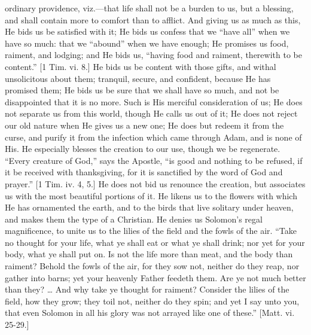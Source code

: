 ordinary providence, viz.—that life shall not be a burden to us, but
a blessing, and shall contain more to comfort than to afflict. And
giving us as much as this, He bids us be satisfied with it; He bids us
confess that we ``have all'' when we have so much: that we
``abound'' when we have enough; He promises us food, raiment,
and lodging; and He bids us, ``having food and raiment, therewith
to be content.'' [1 Tim. vi. 8.] He bids us be content with those
gifts, and withal unsolicitous about them; tranquil, secure, and
confident, because He has promised them; He bids us be sure that we
shall have so much, and not be disappointed that it is no more. Such
is His merciful consideration of us; He does not separate us from this
world, though He calls us out of it; He does not reject our old nature
when He gives us a new one; He does but redeem it from the curse, and
purify it from the infection which came through Adam, and is none of
His. He especially blesses the creation to our use, though we be
regenerate. ``Every creature of God,'' says the Apostle,
``is good and nothing to be refused, if it be received with
thanksgiving, for it is sanctified by the word of God and
prayer.'' [1 Tim. iv. 4, 5.] He does not bid us renounce the
creation, but associates us with the most beautiful portions of it. He
likens us to the flowers with which He has ornamented the earth, and
to the birds that live solitary under heaven, and makes them the type
of a Christian. He denies us Solomon's regal magnificence, to unite us
to the lilies of the field and the fowls of the air. ``Take no
thought for your life, what ye shall eat or what ye shall drink; nor
yet for your body, what ye shall put on. Is not the life more than
meat, and the body than raiment? Behold the fowls of the air, for they
sow not, neither do they reap, nor gather into barns; yet your
heavenly Father feedeth them. Are ye not much better than they? …
And why take ye thought for raiment? Consider the lilies of the field,
how they grow; they toil not, neither do they spin; and yet I say unto
you, that even Solomon in all his glory was not arrayed like one of
these.'' [Matt. vi. 25-29.]


